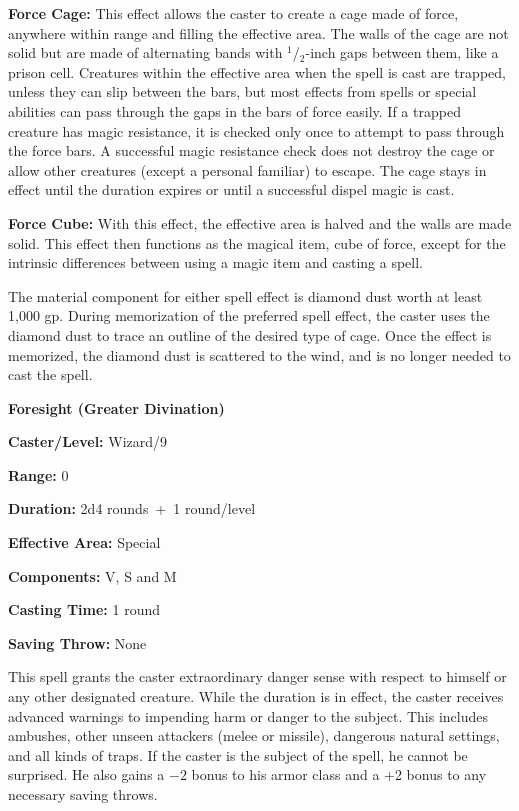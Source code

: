 \begin{multicols}{2}
\textbf{Force Cage:} This effect allows the caster to create a cage made of force, anywhere within range and filling the effective area.  The walls of the cage are not solid but are made of alternating bands with $^1$/$_2$-inch gaps between them, like a prison cell.  Creatures within the effective area when the spell is cast are trapped, unless they can slip between the bars, but most effects from spells or special abilities can pass through the gaps in the bars of force easily.  If a trapped creature has magic resistance, it is checked only once to attempt to pass through the force bars.  A successful magic resistance check does not destroy the cage or allow other creatures (except a personal familiar) to escape.  The cage stays in effect until the duration expires or until a successful dispel magic is cast.

\textbf{Force Cube:} With this effect, the effective area is halved and the walls are made solid.  This effect then functions as the magical item, cube of force, except for the intrinsic differences between using a magic item and casting a spell.  

The material component for either spell effect is diamond dust worth at least 1,000 gp.  During memorization of the preferred spell effect, the caster uses the diamond dust to trace an outline of the desired type of cage.  Once the effect is memorized, the diamond dust is scattered to the wind, and is no longer needed to cast the spell.

\vspace{1em}

\noindent
\begin{minipage}{\columnwidth}

\noindent \textbf{Foresight (Greater Divination)}

\noindent \textbf{Caster/Level:} Wizard/9

\noindent \textbf{Range:} 0

\noindent \textbf{Duration:} 2d4 rounds~+~1 round/level

\noindent \textbf{Effective Area:} Special

\noindent \textbf{Components:} V, S and M

\noindent \textbf{Casting Time:} 1 round

\noindent \textbf{Saving Throw:} None

\end{minipage}

This spell grants the caster extraordinary danger sense with respect to himself or any other designated creature.  While the duration is in effect, the caster receives advanced warnings to impending harm or danger to the subject.  This includes ambushes, other unseen attackers (melee or missile), dangerous natural settings, and all kinds of traps.  If the caster is the subject of the spell, he cannot be surprised.  He also gains a $-2$ bonus to his armor class and a +2 bonus to any necessary saving throws.  


\end{multicols}
